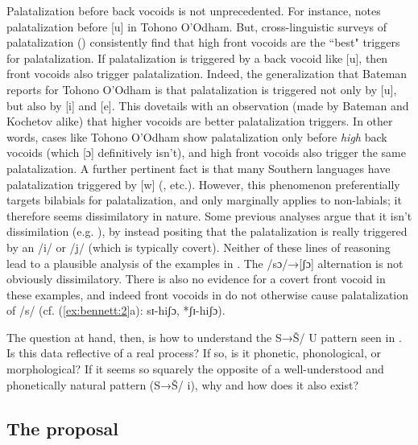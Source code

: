 \documentclass[output=paper,newtxmath,modfonts,nonflat]{langsci/langscibook}
\begin{document}
Palatalization before back vocoids is not unprecedented. For instance, \citet[68]{Bateman:2007aa} notes palatalization before [u] in Tohono O’Odham. But, cross-linguistic surveys of palatalization (\citealt{Bateman:2007aa,Kochetov2011}) consistently find that high front vocoids are the ``best" triggers for palatalization. If palatalization is triggered by a back vocoid like [u], then front vocoids also trigger palatalization. Indeed, the generalization that Bateman reports for Tohono O’Odham is that palatalization is triggered not only by [u], but also by [i] and [e]. This dovetails with an observation (made by Bateman and Kochetov alike) that higher vocoids are better palatalization triggers. In other words, cases like Tohono O’Odham show palatalization only before \textit{high} back vocoids (which [ɔ] definitively isn’t), and high front vocoids also trigger the same palatalization.
A further pertinent fact is that many Southern  languages have palatalization triggered by [w] (\citealt{Louw1975,Ohala1978,Herbert1990,Bennett2015,Bennett&Braver2016}, etc.).  However, this phenomenon preferentially targets bilabials for palatalization, and only marginally applies to non-labials; it therefore seems dissimilatory in nature. Some previous analyses argue that it isn’t dissimilation (e.g. \citealt{Kotze&Zerbian2008}), by instead positing that the palatalization is really triggered by an /i/ or /j/ (which is typically covert). Neither of these lines of reasoning lead to a plausible analysis of the  examples in . The /sɔ/→[ʃɔ] alternation is not obviously dissimilatory. There is also no evidence for a covert front vocoid in these examples, and indeed front vocoids in  do not otherwise cause palatalization of /s/ (cf. (\ref{ex:bennett:2}a): sɪ-hiʃɔ, *ʃɪ-hiʃɔ).

The question at hand, then, is how to understand the S→Š/ {\longrule} U pattern seen in . Is this data reflective of a real process? If so, is it phonetic, phonological, or morphological? If it seems so squarely the opposite of a well-understood and phonetically natural pattern (S→Š/ {\longrule} i), why and how does it also exist?

\subsection{The proposal}\label{sec:bennett:1.2}
\end{document}
